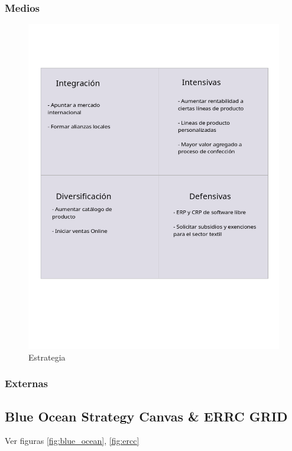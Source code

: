 \documentclass[11pt]{article}
\begin{document}
\subsubsection{Medios}
\label{sec:orged4e532}

\begin{figure}[H]
\centering
\includegraphics[width=.9\linewidth]{./assets/build/means.png}
\caption{\label{fig:orgc401d31}Estrategia}
\end{figure}

\subsubsection{Externas}
\label{sec:orgd3c9b75}

\subsection{Blue Ocean Strategy Canvas \& ERRC GRID}
\label{sec:org22b177e}
Ver figuras \ref{fig:blue_ocean}, \ref{fig:ercc}
\end{document}
